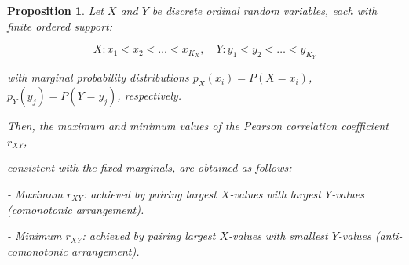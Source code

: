 \documentclass[
  12pt,
]{article}
\newtheorem{proposition}{Proposition}
\begin{document}
\begin{proposition}


Let $X$ and $Y$ be discrete ordinal random variables, each with finite ordered support:

$$
X: x_1 < x_2 < \dots < x_{K_X},\quad Y: y_1 < y_2 < \dots < y_{K_Y}
$$

with marginal probability distributions $p_X(x_i) = P(X = x_i)$, $p_Y(y_j) = P(Y = y_j)$, respectively.

Then, the maximum and minimum values of the Pearson correlation coefficient $r_{XY}$,


consistent with the fixed marginals, are obtained as follows:

- Maximum $r_{XY}$: achieved by pairing largest $X$-values with largest $Y$-values (comonotonic arrangement).
    
- Minimum $r_{XY}$: achieved by pairing largest $X$-values with smallest $Y$-values (anti-comonotonic arrangement).
    
\end{proposition}
\end{document}
